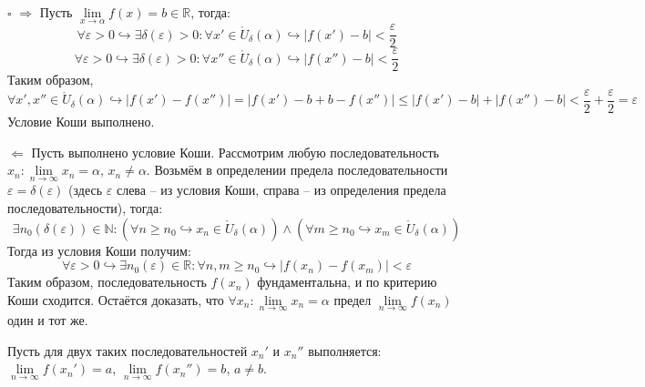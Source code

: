\documentclass[12pt, a4paper, reqno]{article}
\begin{document}
    $\square$ $\boxed{\Rightarrow}$ Пусть $\lim\limits_{x\to\alpha} f(x) = b\in\mathbb{R}$, тогда:
    \begin{equation*}
        \forall\varepsilon > 0\hookrightarrow \exists\delta(\varepsilon) > 0: \forall
        x'\in\mathring U_{\delta}(\alpha)\hookrightarrow |f(x') - b| < \dfrac{\varepsilon}{2}
    \end{equation*}
    \begin{equation*}
        \forall\varepsilon > 0\hookrightarrow \exists\delta(\varepsilon) > 0: \forall
        x''\in\mathring U_{\delta}(\alpha)\hookrightarrow |f(x'') - b| < \dfrac{\varepsilon}{2}
    \end{equation*}
    Таким образом,
    \begin{equation*}
        \forall x', x''\in\mathring U_{\delta}(\alpha)\hookrightarrow |f(x') - f(x'')| =
        |f(x') - b + b - f(x'')| \leq |f(x') - b| + |f(x'') - b| < \dfrac{\varepsilon}{2} +
        \dfrac{\varepsilon}{2} = \varepsilon
    \end{equation*}
    Условие Коши выполнено.

    $\boxed{\Leftarrow}$ Пусть выполнено условие Коши. Рассмотрим любую последовательность $x_n:
    \lim\limits_{n\to\infty} x_n = \alpha$, $x_n \neq \alpha$. Возьмём в определении предела
    последовательности $\varepsilon = \delta(\varepsilon)$ (здесь $\varepsilon$ слева -- из условия
    Коши, справа -- из определения предела последовательности), тогда:
    \begin{equation*}
        \exists n_0(\delta(\varepsilon))\in\mathbb{N}: (\forall n\geq n_0\hookrightarrow x_n\in
        \mathring U_{\delta}(\alpha))\wedge(\forall m\geq n_0\hookrightarrow x_m\in \mathring
        U_{\delta}(\alpha))
    \end{equation*}
    Тогда из условия Коши получим:
    \begin{equation*}
        \forall\varepsilon > 0\hookrightarrow\exists n_0(\varepsilon)\in\mathbb{R}: \forall n, m
        \geq n_0 \hookrightarrow |f(x_n) - f(x_m)| < \varepsilon
    \end{equation*}
    Таким образом, последовательность $f(x_n)$ фундаментальна, и по критерию Коши сходится. Остаётся
    доказать, что $\forall x_n: \lim\limits_{n\to\infty} x_n = \alpha$ предел
    $\lim\limits_{n\to\infty} f(x_n)$ один и тот же.

    Пусть для двух таких последовательностей $x_{n}'$ и $x_{n}''$ выполняется:
    $\lim\limits_{n\to\infty} f(x_{n}') = a$, $\lim\limits_{n\to\infty} f(x_{n}'') = b$, $a\neq b$.
\end{document}
